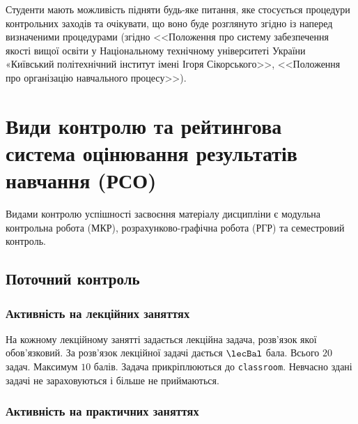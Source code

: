 \documentclass{Syllabus}
\begin{document}
Студенти мають можливість підняти будь-яке питання, яке стосується процедури контрольних заходів та очікувати, що воно буде розглянуто згідно із наперед визначеними процедурами (згідно <<Положення про систему забезпечення якості вищої освіти у Національному технічному університеті України «Київський політехнічний інститут імені Ігоря Сікорського>>, <<Положення про організацію навчального процесу>>).

\section{Види контролю та рейтингова система оцінювання результатів навчання (РСО)}

%



Видами контролю успішності засвоєння матеріалу дисципліни є  модульна контрольна робота (МКР), розрахунково-графічна робота (РГР) та семестровий контроль.


\subsection*{Поточний контроль}

\subsubsection*{Активність на лекційних заняттях}
На кожному лекційному занятті задається лекційна задача, роз\-в'язок якої обов'язковий. За роз\-в'язок лекційної задачі дається $\lecBal$ бала. Всього $
20 $ задач. Максимум $ 10 $ балів. Задача прикріплюються до \texttt{classroom}. Невчасно здані задачі не зараховуються і більше не приймаються.

\subsubsection*{Активність на практичних заняттях}
\end{document}
